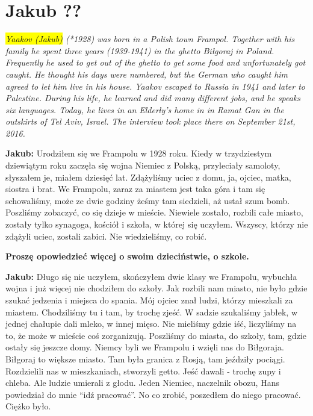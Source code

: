 \section{Jakub ??}
\begin{otherlanguage}{polish}
\textit{\colorbox{yellow}{Yaakov (Jakub)} (*1928) was born in a Polish town Frampol. Together with his family he spent three years (1939-1941) in the ghetto Biłgoraj in Poland. Frequently he used to get out of the ghetto to get some food and unfortunately got caught. He thought his days were numbered, but the German who caught him agreed to let him live in his house. Yaakov escaped to Russia in 1941 and later to Palestine. During his life, he learned and did many different jobs, and he speaks six languages. Today, he lives in an Elderly’s home in in Ramat Gan in the outskirts of Tel Aviv, Israel. The interview took place there on September 21st, 2016.}\par
\vspace*{2em}
\textbf{Jakub:} Urodziłem się we Frampolu w 1928 roku. Kiedy w trzydziestym dziewiątym roku zaczęła się wojna Niemiec z Polską, przyleciały samoloty, słyszałem je, miałem dziesięć lat. Zdążyliśmy uciec z domu, ja, ojciec, matka, siostra i brat. We Frampolu, zaraz za miastem jest taka góra i tam się schowaliśmy, może ze dwie godziny żeśmy tam siedzieli, aż ustał szum bomb. Poszliśmy zobaczyć, co się dzieje w mieście. Niewiele zostało, rozbili całe miasto, zostały tylko synagoga, kościół i szkoła, w której się uczyłem. Wszyscy, którzy nie zdążyli uciec, zostali zabici. Nie wiedzieliśmy, co robić.  

\textbf{Proszę opowiedzieć więcej o swoim dzieciństwie, o szkole.} 

\textbf{Jakub:} Długo się nie uczyłem, skończyłem dwie klasy we Frampolu, wybuchła wojna i już więcej nie chodziłem do szkoły. Jak rozbili nam miasto, nie było gdzie szukać jedzenia i miejsca do spania. Mój ojciec znał ludzi, którzy mieszkali za miastem. Chodziliśmy tu i tam, by trochę zjeść. W sadzie szukaliśmy jabłek, w jednej chałupie dali mleko, w innej mięso. Nie mieliśmy gdzie iść, liczyliśmy na to, że może w mieście coś zorganizują. Poszliśmy do miasta, do szkoły, tam, gdzie ostały się jeszcze domy. Niemcy byli we Frampolu i wzięli nas do Biłgoraja. Biłgoraj to większe miasto. Tam była granica z Rosją, tam jeździły pociągi. Rozdzielili nas w mieszkaniach, stworzyli getto. Jeść dawali - trochę zupy i chleba. Ale ludzie umierali z głodu. Jeden Niemiec, naczelnik obozu, Hans powiedział do mnie "`idź pracować"'. No co zrobić, poszedłem do niego pracować. Ciężko było.


\end{otherlanguage}
